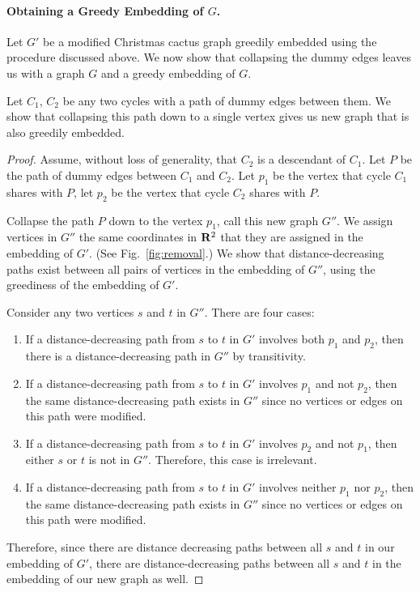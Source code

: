 \documentclass[11pt]{article}
\newcommand{\R}{{\bf R}}
\renewcommand{\subsection}[1]{\paragraph{#1.}}
\begin{document}
\subsection{Obtaining a Greedy Embedding of $G$}

Let $G'$ be a modified Christmas cactus graph greedily embedded using the 
procedure discussed above. We now show that collapsing the dummy edges 
leaves us with a graph $G$ and a greedy embedding of $G$. 

Let $C_1$, $C_2$ be any two cycles with a path of dummy edges between 
them. We show that collapsing this path down to a single vertex gives 
us new graph that is also greedily embedded.

\begin{proof}
Assume, without loss of generality, that $C_2$ is a descendant of $C_1$.
Let $P$ be the path of dummy edges between $C_1$ and $C_2$. Let $p_1$ be the vertex 
that cycle $C_1$ shares with $P$, let $p_2$ be the vertex that cycle $C_2$ 
shares with $P$. 

Collapse the path $P$ down to the vertex $p_1$, call this new graph $G''$. 
We assign vertices in $G''$ the same coordinates in $\R^2$ that they are 
assigned in the embedding of $G'$. (See Fig.~\ref{fig:removal}.) 
We show that distance-decreasing paths exist between all pairs of vertices 
in the embedding of $G''$, using the greediness of the embedding of $G'$.

Consider any two vertices $s$ and $t$ in $G''$. There are four cases:

\begin{enumerate}

\item If a distance-decreasing path from $s$ to $t$ in $G'$ involves both 
$p_1$ and $p_2$, then there is a distance-decreasing path in $G''$ 
by transitivity.

\item If a distance-decreasing path from $s$ to $t$ in $G'$ involves $p_1$ 
and not $p_2$, then the same distance-decreasing path exists in $G''$
since no vertices or edges on this path were modified.

\item If a distance-decreasing path from $s$ to $t$ in $G'$ involves $p_2$ and 
not $p_1$, then either $s$ or $t$ is not in $G''$. Therefore, this case 
is irrelevant.

\item If a distance-decreasing path from $s$ to $t$ in $G'$ involves neither 
$p_1$ nor $p_2$, then the same distance-decreasing path exists in $G''$
since no vertices or edges on this path were modified.
\end{enumerate}
Therefore, since there are distance decreasing paths between all $s$ and $t$ in
our embedding of $G'$, there are distance-decreasing paths between all $s$ and $t$
in the embedding of our new graph as well.
\end{proof}
\end{document}

